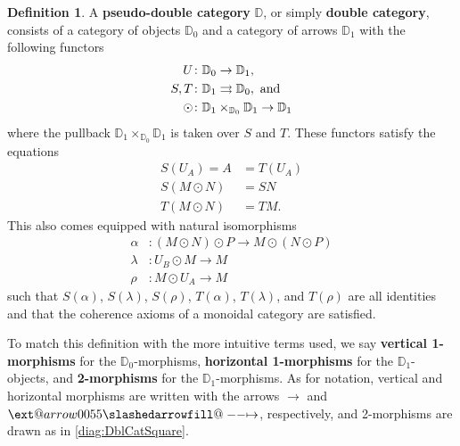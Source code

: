 \documentclass[11pt]{amsart}
\makeatletter
\newcommand{\dblcat}[1]{\mathbb{#1}}
\renewcommand{\t}[1]{\textup{#1}}
\newcommand{\from}{\colon}
\def\slashedarrowfill@#1#2#3#4#5{%
	$\m@th\thickmuskip0mu\medmuskip\thickmuskip\thinmuskip\thickmuskip
	\relax#5#1\mkern-7mu%
	\cleaders\hbox{$#5\mkern-2mu#2\mkern-2mu$}\hfill
	\mathclap{#3}\mathclap{#2}%
	\cleaders\hbox{$#5\mkern-2mu#2\mkern-2mu$}\hfill
	\mkern-7mu#4$%
}
\def\rightslashedarrowfill@{%
	\slashedarrowfill@\relbar\relbar\mapstochar\rightarrow}
\newcommand{\xslashedrightarrow}[2][]{%
	\ext@arrow 0055{\rightslashedarrowfill@}{#1}{#2}}
\newcommand{\hto}{\xslashedrightarrow{}}
\theoremstyle{remark}
\theoremstyle{definition}
\newtheorem{defn}[thm]{Definition}
\makeatother
\begin{document}
%
\begin{defn}
	\label{def:DoubleCategory}
	A \textbf{pseudo-double category} $\dblcat{D}$, 
	or simply \textbf{double category}, consists of 
	a category of objects $\dblcat{D}_{0}$ and 
	a category of arrows $\dblcat{D}_{1}$ 
	with the following functors
	\begin{equation*}
		\begin{split}
			U & 
				\from \dblcat{D}_{0} \to \dblcat{D}_{1}, \\
			S,T & 
				\from \dblcat{D}_{1} \rightrightarrows \dblcat{D}_{0}, \t{ and} \\
			\odot & 
				\from \dblcat{D}_{1} \times_{\dblcat{D}_{0}} \dblcat{D}_{1} 
					\to \dblcat{D}_{1}
		\end{split}
	\end{equation*}
	where the pullback 
		$\dblcat{D}_{1} \times_{\dblcat{D}_{0}} \dblcat{D}_{1}$ 
	is taken over $S$ and $T$.  
	These functors satisfy the equations
	\begin{equation*}
		\begin{split}
			S(U_{A}) = A & = T(U_{A}) \\
			S(M \odot N) & = SN \\
			T(M \odot N) & = TM. 
	\end{split}
	\end{equation*}
	This also comes equipped with natural isomorphisms
	\begin{equation*}
		\begin{split}
		\alpha & \from (M \odot N) \odot P \to M \odot (N \odot P)\\
		\lambda & \from U_{B} \odot M \to M\\
		\rho & \from M \odot U_{A} \to M
	\end{split}
	\end{equation*}
	such that 
		$S(\alpha)$, 
		$S(\lambda)$, 
		$S(\rho)$, 
		$T(\alpha)$, 
		$T(\lambda)$, and 
		$T(\rho)$ 
	are all identities and that 
	the coherence axioms of a monoidal category are satisfied. 
	
	To match this definition with the more intuitive terms used, we say
	\textbf{vertical 1-morphisms} for the $\dblcat{D}_{0}$-morphisms,
	\textbf{horizontal 1-morphisms} for the $\dblcat{D}_{1}$-objects, and
	\textbf{2-morphisms} for the $\dblcat{D}_{1}$-morphisms. 
	As for notation, vertical and horizontal morphisms 
	are written with the arrows $\to$ and $\hto$, respectively, and 
	2-morphisms are drawn as in 
		\eqref{diag:DblCatSquare}.
\end{defn}
\end{document}
